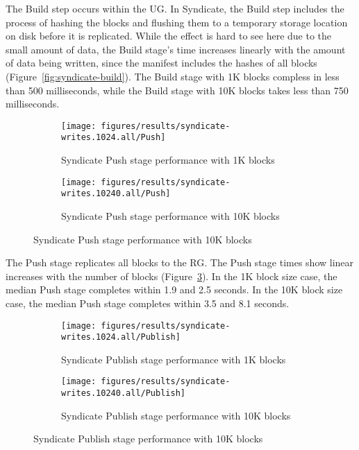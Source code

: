 The Build step occurs within the UG.  In Syndicate, the Build step includes the
process of hashing the blocks and flushing them to a temporary storage location on
disk before it is replicated.  While the effect is hard to see here due to the 
small amount of data, the Build stage's time increases linearly with the amount
of data being written, since the manifest includes the hashes of all blocks
(Figure~\ref{fig:syndicate-build}).  The Build stage with 1K blocks compless in
less than 500 milliseconds, while the Build stage with 10K blocks takes less
than 750 milliseconds.

\begin{figure}[htp!]
   \centering
   \caption{Box-and-whiskers plots of the Push stage performance, for 1K and
   10K blocks.}
   \begin{subfigure}[b]{.8\textwidth}
      \texttt{[image: figures/results/syndicate-writes.1024.all/Push]}
      \label{fig:syndicate-push-1k}
      \caption{Syndicate Push stage performance with 1K blocks}
   \end{subfigure}
   \begin{subfigure}[b]{.8\textwidth}
      \texttt{[image: figures/results/syndicate-writes.10240.all/Push]}
      \label{fig:syndicate-push-10k}
      \caption{Syndicate Push stage performance with 10K blocks}
   \end{subfigure}
   \label{fig:syndicate-push}
\end{figure}

The Push stage replicates all blocks to the RG.  The Push stage times show linear
increases with the number of blocks (Figure~\ref{fig:syndicate-push}).
In the 1K block size case, the median Push stage
completes within 1.9 and 2.5 seconds.  In the 10K block size case, the median
Push stage completes within 3.5 and 8.1 seconds.

\begin{figure}[htp!]
   \centering
   \caption{Box-and-whiskers plots of the Publish stage performance, for 1K and
   10K blocks.}
   \begin{subfigure}[b]{.8\textwidth}
      \texttt{[image: figures/results/syndicate-writes.1024.all/Publish]}
      \label{fig:syndicate-publish-1k}
      \caption{Syndicate Publish stage performance with 1K blocks}
   \end{subfigure}
   \begin{subfigure}[b]{.8\textwidth}
      \texttt{[image: figures/results/syndicate-writes.10240.all/Publish]}
      \label{fig:syndicate-publish-10k}
      \caption{Syndicate Publish stage performance with 10K blocks}
   \end{subfigure}
   \label{fig:syndicate-publish}
\end{figure}

